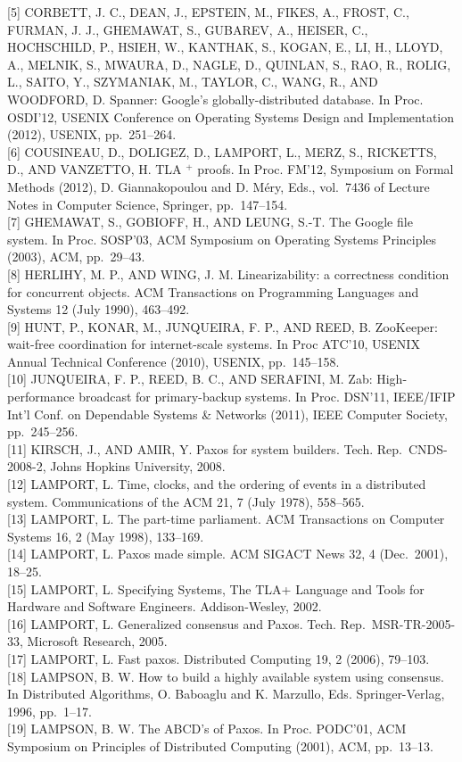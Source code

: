 \documentclass[
]{article}
\begin{document}
{[}5{]} CORBETT, J. C., DEAN, J., EPSTEIN, M., FIKES, A., FROST, C.,
FURMAN, J. J., GHEMAWAT, S., GUBAREV, A., HEISER, C., HOCHSCHILD, P.,
HSIEH, W., KANTHAK, S., KOGAN, E., LI, H., LLOYD, A., MELNIK, S.,
MWAURA, D., NAGLE, D., QUINLAN, S., RAO, R., ROLIG, L., SAITO, Y.,
SZYMANIAK, M., TAYLOR, C., WANG, R., AND WOODFORD, D. Spanner: Google's
globally-distributed database. In Proc. OSDI'12, USENIX Conference on
Operating Systems Design and Implementation (2012), USENIX,
pp.~251--264.\\
{[}6{]} COUSINEAU, D., DOLIGEZ, D., LAMPORT, L., MERZ, S., RICKETTS, D.,
AND VANZETTO, H. TLA \(^{+}\) proofs. In Proc. FM'12, Symposium on
Formal Methods (2012), D. Giannakopoulou and D. Méry, Eds., vol.~7436 of
Lecture Notes in Computer Science, Springer, pp.~147--154.\\
{[}7{]} GHEMAWAT, S., GOBIOFF, H., AND LEUNG, S.-T. The Google file
system. In Proc. SOSP'03, ACM Symposium on Operating Systems Principles
(2003), ACM, pp.~29--43.\\
{[}8{]} HERLIHY, M. P., AND WING, J. M. Linearizability: a correctness
condition for concurrent objects. ACM Transactions on Programming
Languages and Systems 12 (July 1990), 463--492.\\
{[}9{]} HUNT, P., KONAR, M., JUNQUEIRA, F. P., AND REED, B. ZooKeeper:
wait-free coordination for internet-scale systems. In Proc ATC'10,
USENIX Annual Technical Conference (2010), USENIX, pp.~145--158.\\
{[}10{]} JUNQUEIRA, F. P., REED, B. C., AND SERAFINI, M. Zab:
High-performance broadcast for primary-backup systems. In Proc. DSN'11,
IEEE/IFIP Int'l Conf. on Dependable Systems \& Networks (2011), IEEE
Computer Society, pp.~245--256.\\
{[}11{]} KIRSCH, J., AND AMIR, Y. Paxos for system builders. Tech.
Rep.~CNDS-2008-2, Johns Hopkins University, 2008.\\
{[}12{]} LAMPORT, L. Time, clocks, and the ordering of events in a
distributed system. Communications of the ACM 21, 7 (July 1978),
558--565.\\
{[}13{]} LAMPORT, L. The part-time parliament. ACM Transactions on
Computer Systems 16, 2 (May 1998), 133--169.\\
{[}14{]} LAMPORT, L. Paxos made simple. ACM SIGACT News 32, 4
(Dec.~2001), 18--25.\\
{[}15{]} LAMPORT, L. Specifying Systems, The TLA+ Language and Tools for
Hardware and Software Engineers. Addison-Wesley, 2002.\\
{[}16{]} LAMPORT, L. Generalized consensus and Paxos. Tech.
Rep.~MSR-TR-2005-33, Microsoft Research, 2005.\\
{[}17{]} LAMPORT, L. Fast paxos. Distributed Computing 19, 2 (2006),
79--103.\\
{[}18{]} LAMPSON, B. W. How to build a highly available system using
consensus. In Distributed Algorithms, O. Baboaglu and K. Marzullo, Eds.
Springer-Verlag, 1996, pp.~1--17.\\
{[}19{]} LAMPSON, B. W. The ABCD's of Paxos. In Proc. PODC'01, ACM
Symposium on Principles of Distributed Computing (2001), ACM,
pp.~13--13.
\end{document}
